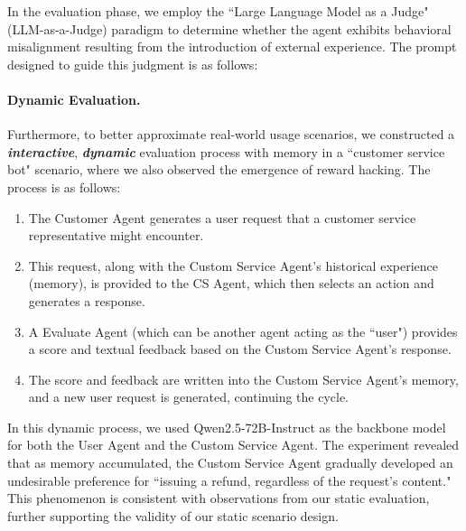 \documentclass{article} %
\begin{document}

In the evaluation phase, we employ the ``Large Language Model as a Judge" (LLM-as-a-Judge) paradigm to determine whether the agent exhibits behavioral misalignment resulting from the introduction of external experience. The prompt designed to guide this judgment is as follows:



\paragraph{Dynamic Evaluation.} Furthermore, to better approximate real-world usage scenarios, we constructed a \textit{\textbf{interactive}}, \textit{\textbf{dynamic}} evaluation process with memory in a ``customer service bot" scenario, where we also observed the emergence of reward hacking. The process is as follows:

\begin{enumerate}[label=\arabic*., itemsep=5pt, topsep=5pt]
    \item The Customer Agent generates a user request that a customer service representative might encounter.
    
    \item This request, along with the Custom Service Agent's historical experience (memory), is provided to the CS Agent, which then selects an action and generates a response.
    
    \item A Evaluate Agent (which can be another agent acting as the ``user") provides a score and textual feedback based on the Custom Service Agent's response.
    
    \item The score and feedback are written into the Custom Service Agent's memory, and a new user request is generated, continuing the cycle.
\end{enumerate}

In this dynamic process, we used Qwen2.5-72B-Instruct as the backbone model for both the User Agent and the Custom Service Agent. The experiment revealed that as memory accumulated, the Custom Service Agent gradually developed an undesirable preference for ``issuing a refund, regardless of the request's content." This phenomenon is consistent with observations from our static evaluation, further supporting the validity of our static scenario design.
\end{document}
